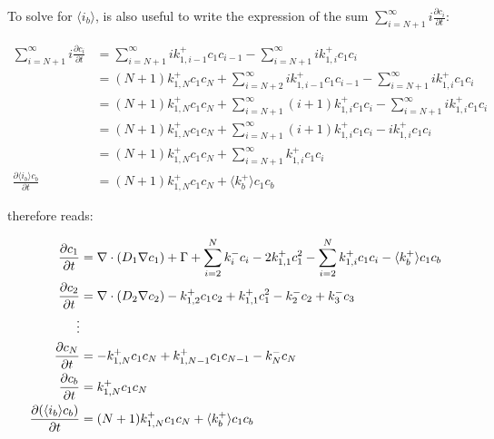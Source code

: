 To solve for $\langle i_b \rangle$, is also useful to write the expression of the sum $\sum\limits_{i=N+1}^\infty i \frac{\partial c_i}{\partial t}$:

\begin{align}
    \sum\limits_{i=N+1}^\infty i \frac{\partial c_i}{\partial t} &= \sum\limits_{i=N+1}^\infty i k_{1,i-1}^+ c_1 c_{i-1} - \sum\limits_{i=N+1}^\infty i k_{1,i}^+ c_1 c_{i} \nonumber\\
    &= (N+1) k_{1,N}^+ c_1 c_N + \sum\limits_{i=N+2}^\infty i k_{1,i-1}^+ c_1 c_{i-1} - \sum\limits_{i=N+1}^\infty i k_{1,i}^+ c_1 c_{i} \nonumber\\
    &= (N+1) k_{1,N}^+ c_1 c_N + \sum\limits_{i=N+1}^\infty (i + 1) k_{1,i}^+ c_1 c_{i} - \sum\limits_{i=N+1}^\infty i k_{1,i}^+ c_1 c_{i} \nonumber\\
    &= (N+1) k_{1,N}^+ c_1 c_N + \sum\limits_{i=N+1}^\infty (i + 1) k_{1,i}^+ c_1 c_{i} - i k_{1,i}^+ c_1 c_{i} \nonumber\\
    &= (N+1) k_{1,N}^+ c_1 c_N + \sum\limits_{i=N+1}^\infty k_{1,i}^+ c_1 c_{i} \nonumber\\
    \frac{\partial \langle i_b \rangle c_b}{\partial t} &= (N+1) k_{1,N}^+ c_1 c_N + \langle k_b^+ \rangle c_1 c_b
\end{align}


 therefore reads:

\begin{subequations}
    \begin{align}
        \frac{\partial c_1}{\partial t} &= \nabla \cdot (D_1 \nabla c_1) + \Gamma + \sum\limits_{i=2}^N k_{i}^- c_i- 2k_{1, 1}^+ c_1^2 - \sum\limits_{i=2}^N k_{1,i}^+ c_1 c_i - \langle k_b^+ \rangle c_1 c_b \\
        \frac{\partial c_2}{\partial t} &= \nabla \cdot (D_2 \nabla c_2) - k_{1, 2}^+ c_1 c_2 + k_{1, 1}^+ c_1^2 - k_{2}^- c_2 + k_{3}^- c_3\\
        \vdots \nonumber\\
        \frac{\partial c_N}{\partial t} &= - k_{1, N}^+ c_1 c_N + k_{1, N-1}^+ c_1 c_{N-1} - k_{N}^- c_N\\
        \frac{\partial c_b}{\partial t} &= k_ {1,N}^+ c_1 c_N \\
        \frac{\partial (\langle i_b \rangle c_b)}{\partial t} &= (N+1)k_ {1,N}^+ c_1 c_N  + \langle k_b^+ \rangle c_1 c_b
    \end{align}
    \labeq{temporal evolution grouping}
\end{subequations}

